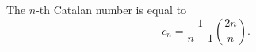 

\setcounter{section}{4}
\setcounter{subsection}{2}
\setcounter{dfn}{2}

\begin{thm}
\label{thm:CatalanFormula}
The $n$-th Catalan number is equal to
\begin{equation}
\label{eqn:CatalanFormula}
c_n = \frac1{n+1} \binom{2n}{n}.
\end{equation}
\end{thm}



